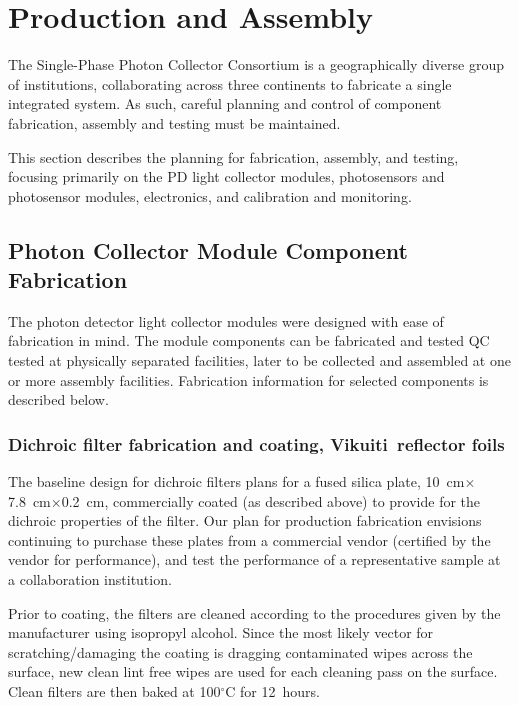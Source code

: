 \section{Production and Assembly}
\label{sec:fdsp-pd-prod-assy}

The Single-Phase Photon Collector Consortium is a geographically diverse group of institutions, collaborating across three continents to fabricate a single integrated system.  As such, careful planning and control of component fabrication, assembly and testing must be maintained.

This section describes the planning for fabrication, assembly, and testing, focusing primarily on the PD light collector modules, photosensors and photosensor modules, electronics, and calibration and monitoring.

\subsection{Photon Collector Module Component Fabrication}
The photon detector light collector modules were designed with ease of fabrication in mind.  The module components can be fabricated and tested QC tested at physically separated facilities, later to be collected and assembled at one or more assembly facilities.  Fabrication information for selected components is described below.

\subsubsection{Dichroic filter fabrication and coating, Vikuiti\texttrademark\ reflector foils}

The baseline design for dichroic filters plans for a fused silica plate,  \SI{10}{cm}$\times$\SI{7.8}{cm}$\times$\SI{0.2}{cm}, commercially coated (as described above) to provide for the dichroic properties of the filter.  Our plan for production fabrication envisions continuing to purchase these plates from a commercial vendor (certified by the vendor for performance), and test the performance of a representative sample at a collaboration institution.  

Prior to coating, the filters are cleaned according to the procedures given by the manufacturer using isopropyl alcohol. Since the most likely vector for scratching/damaging the coating is dragging contaminated wipes across the surface, new clean lint free wipes are used for each  cleaning pass on the surface. Clean filters are then baked at 100$^\circ$C for \SI{12}{hours}. 

